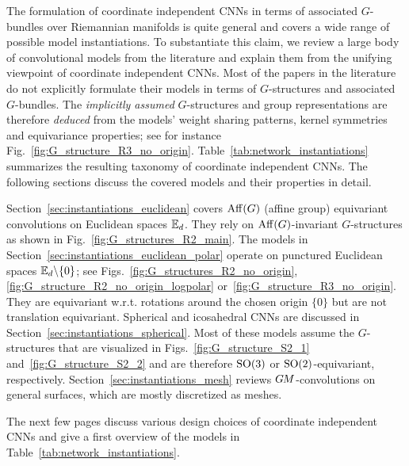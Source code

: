 

\label{part:literature_review}


The formulation of coordinate independent CNNs in terms of associated $G$-bundles over Riemannian manifolds is quite general and covers a wide range of possible model instantiations.
To substantiate this claim, we review a large body of convolutional models from the literature and explain them from the unifying viewpoint of coordinate independent CNNs.
Most of the papers in the literature do not explicitly formulate their models in terms of $G$-structures and associated $G$-bundles.
The \emph{implicitly assumed} $G$-structures and group representations are therefore \emph{deduced} from the models' weight sharing patterns, kernel symmetries and equivariance properties; see for instance Fig.~\ref{fig:G_structure_R3_no_origin}.
Table~\ref{tab:network_instantiations} summarizes the resulting taxonomy of coordinate independent CNNs.
The following sections discuss the covered models and their properties in detail.


\etocsettocstyle{}{} %
\localtableofcontents


Section~\ref{sec:instantiations_euclidean} covers $\operatorname{Aff}(G)$ (affine group) equivariant convolutions on Euclidean spaces $\mathbb{E}_d$.
They rely on $\operatorname{Aff}(G)$-invariant $G$-structures as shown in Fig.~\ref{fig:G_structures_R2_main}.
The models in Section~\ref{sec:instantiations_euclidean_polar} operate on punctured Euclidean spaces $\mathbb{E}_d\backslash\{0\}$; see Figs.~\ref{fig:G_structures_R2_no_origin}, \ref{fig:G_structure_R2_no_origin_logpolar} or~\ref{fig:G_structure_R3_no_origin}.
They are equivariant w.r.t. rotations around the chosen origin $\{0\}$ but are not translation equivariant.
Spherical and icosahedral CNNs are discussed in Section~\ref{sec:instantiations_spherical}.
Most of these models assume the $G$-structures that are visualized in Figs.~\ref{fig:G_structure_S2_1} and~\ref{fig:G_structure_S2_2} and are therefore $\operatorname{SO}(3)$ or $\operatorname{SO}(2)$-equivariant, respectively.
Section~\ref{sec:instantiations_mesh} reviews $G\mkern-1.4muM$-convolutions on general surfaces, which are mostly discretized as meshes.

The next few pages discuss various design choices of coordinate independent CNNs and give a first overview of the models in Table~\ref{tab:network_instantiations}.



